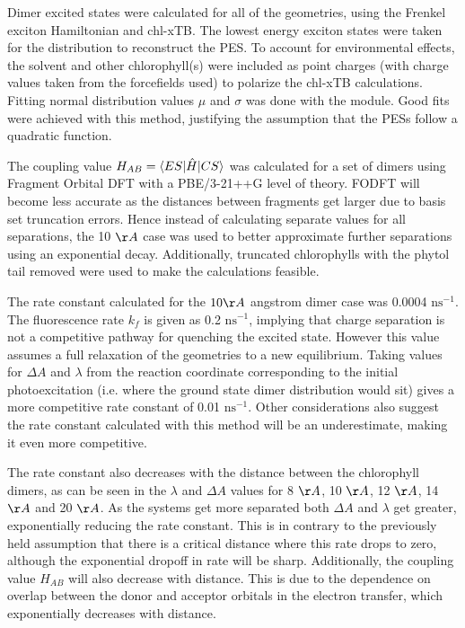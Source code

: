 Dimer excited states were calculated for all of the geometries, using the Frenkel
exciton Hamiltonian and chl-xTB. The lowest energy exciton states were taken for 
the distribution to reconstruct the PES. To account for environmental effects, the
solvent and other chlorophyll(s) were included as point charges (with charge values 
taken from the forcefields used) to polarize the chl-xTB calculations. Fitting normal
distribution values $\mu$ and $\sigma$ was done with the  module.
Good fits were achieved with this method, justifying the assumption that the PESs
follow a quadratic function.

The coupling value $H_{AB} = \braket{ES|\hat{H}|CS}$ was calculated for a set of
dimers using Fragment Orbital DFT with a PBE/3-21++G level of theory. FODFT will
become less accurate as the distances between fragments get larger due to basis
set truncation errors. Hence instead of calculating separate values for all separations,
the 10 $\AA{}$ case was used to better approximate further separations using an
exponential decay. Additionally, truncated chlorophylls with the phytol tail removed
were used to make the calculations feasible.

The rate constant calculated for the $10\AA{}$ angstrom dimer case was 0.0004 $\text{ns}^{-1}$.
The fluorescence rate $k_f$ is given as 0.2 $\text{ns}^{-1}$, implying that charge
separation is not a competitive pathway for quenching the excited state. However
this value assumes a full relaxation of the geometries to a new equilibrium. Taking
values for $\Delta A$ and $\lambda$ from the reaction coordinate corresponding to
the initial photoexcitation (i.e. where the ground state dimer distribution would
sit) gives a more competitive rate constant of 0.01 $\text{ns}^{-1}$. Other considerations
also suggest the rate constant calculated with this method will be an underestimate, 
making it even more competitive.

The rate constant also decreases with the distance between the chlorophyll dimers, as can
be seen in the $\lambda$ and $\Delta A$ values for 8 $\AA{}$, 10 $\AA{}$, 12 $\AA{}$,
14 $\AA{}$ and 20 $\AA{}$. As the systems get more separated both $\Delta A$ and
$\lambda$ get greater, exponentially reducing the rate constant. This is in contrary
to the previously held assumption that there is a critical distance where this rate
drops to zero, although the exponential dropoff in rate will be sharp. Additionally, 
the coupling value $H_{AB}$ will also decrease with distance. This is due to the
dependence on overlap between the donor and acceptor orbitals in the electron transfer, 
which exponentially decreases with distance.

